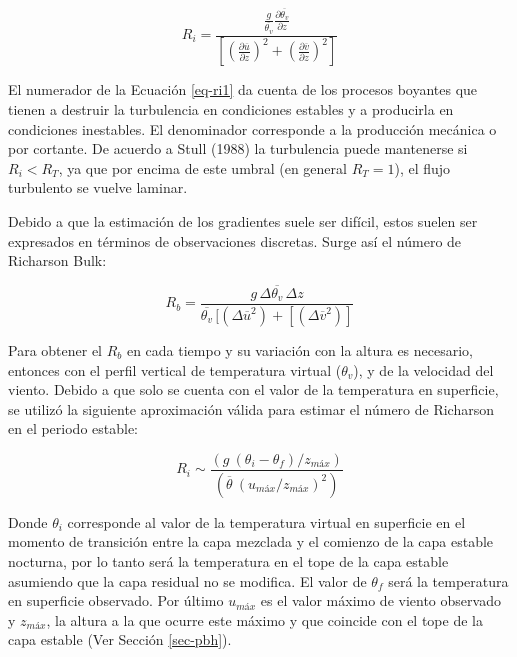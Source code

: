 \documentclass[12pt,spanish,oneside]{book}
\begin{document}
\begin{equation} \label{eq-ri1}
R_i = \frac{\frac{g}{\overline{\theta_v}} \frac{\partial \overline{\theta_v}}{\partial z}}
{\left [ \left (\frac{\partial \overline{u}}{\partial z} \right )^2 + \left (\frac{\partial \overline{v}}{\partial z} \right )^2  \right]}
\end{equation}

El numerador de la Ecuación \ref{eq-ri1} da cuenta de los procesos
boyantes que tienen a destruir la turbulencia en condiciones estables y
a producirla en condiciones inestables. El denominador corresponde a la
producción mecánica o por cortante. De acuerdo a Stull (1988) la
turbulencia puede mantenerse si \(R_i < R_T\), ya que por encima de este
umbral (en general \(R_T = 1\)), el flujo turbulento se vuelve laminar.

Debido a que la estimación de los gradientes suele ser difícil, estos
suelen ser expresados en términos de observaciones discretas. Surge así
el número de Richarson Bulk:

\begin{equation} \label{eq-ri2}
R_b = \frac{g \, \Delta \overline{\theta_v} \, \Delta z}{\overline{\theta_v} \, [(\Delta \overline{u}^2) + [(\Delta \overline{v}^2)]}
\end{equation}

Para obtener el \(R_b\) en cada tiempo y su variación con la altura es
necesario, entonces con el perfil vertical de temperatura virtual
(\(\theta_v\)), y de la velocidad del viento. Debido a que solo se
cuenta con el valor de la temperatura en superficie, se utilizó la
siguiente aproximación válida para estimar el número de Richarson en el
periodo estable:

\begin{equation} \label{eq-ri3}
R_i \sim \frac{(g  \: (\theta_i - \theta_f)/z_{máx})}{(\overline{\theta} \: (u_{máx}/z_{máx})^2)}
\end{equation}

Donde \(\theta_i\) corresponde al valor de la temperatura virtual en
superficie en el momento de transición entre la capa mezclada y el
comienzo de la capa estable nocturna, por lo tanto será la temperatura
en el tope de la capa estable asumiendo que la capa residual no se
modifica. El valor de \(\theta_f\) será la temperatura en superficie
observado. Por último \(u_{máx}\) es el valor máximo de viento observado
y \(z_{máx}\), la altura a la que ocurre este máximo y que coincide con
el tope de la capa estable (Ver Sección \ref{sec-pbh}).
\end{document}
